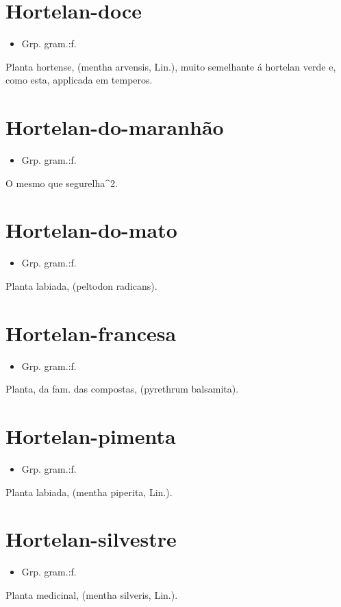 \documentclass{article}
\begin{document}
\section{Hortelan-doce}
\begin{itemize}
\item {Grp. gram.:f.}
\end{itemize}
Planta hortense, (\textunderscore mentha arvensis\textunderscore , Lin.), muito semelhante á hortelan verde e, como esta, applicada em temperos.
\section{Hortelan-do-maranhão}
\begin{itemize}
\item {Grp. gram.:f.}
\end{itemize}
O mesmo que \textunderscore segurelha\textunderscore ^2.
\section{Hortelan-do-mato}
\begin{itemize}
\item {Grp. gram.:f.}
\end{itemize}
Planta labiada, (\textunderscore peltodon radicans\textunderscore ).
\section{Hortelan-francesa}
\begin{itemize}
\item {Grp. gram.:f.}
\end{itemize}
Planta, da fam. das compostas, (\textunderscore pyrethrum balsamita\textunderscore ).
\section{Hortelan-pimenta}
\begin{itemize}
\item {Grp. gram.:f.}
\end{itemize}
Planta labiada, (\textunderscore mentha piperita\textunderscore , Lin.).
\section{Hortelan-silvestre}
\begin{itemize}
\item {Grp. gram.:f.}
\end{itemize}
Planta medicinal, (\textunderscore mentha silveris\textunderscore , Lin.).
\end{document}
